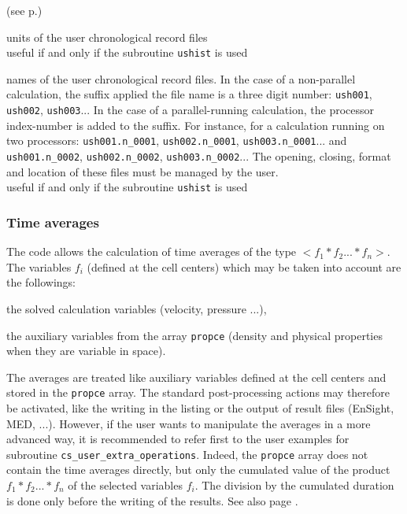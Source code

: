 (see p.\pageref{prg_ushist})

{units of the user chronological record files\\
useful if and only if the subroutine \texttt{ushist} is used}

{names of the user chronological record files.
In the case of a non-parallel calculation, the suffix applied the file
name is a three digit number: \texttt{ush001}, \texttt{ush002},
\texttt{ush003}...
In the case of a parallel-running calculation, the processor
index-number is added to the suffix. For instance, for a calculation
running on two processors:  \texttt{ush001.n\_0001},
\texttt{ush002.n\_0001}, \texttt{ush003.n\_0001}... and
\texttt{ush001.n\_0002},
\texttt{ush002.n\_0002}, \texttt{ush003.n\_0002}...
The opening, closing, format and location of these files must be managed
by the user.\\
useful if and only if the subroutine \texttt{ushist} is used}


\subsubsection{Time averages}

The code allows the calculation of time averages of the type
$<f_1*f_2...*f_n>$. The variables $f_i$ (defined at the cell centers)
which may be taken into account are the followings:
\begin{list}{-}{}
\item the solved calculation variables (velocity, pressure ...),
\item the auxiliary variables from the array {\tt propce} (density and
      physical properties when they are variable in space).
\end{list}

The averages are treated like auxiliary variables defined at the cell
centers and stored in the {\tt propce} array. The standard post-processing
actions may therefore be activated, like the writing in the listing or
the output of result files (EnSight, MED, ...). However, if the user
wants to manipulate the averages in a more advanced way, it is
recommended to refer first to the user examples for subroutine
\texttt{cs\_user\_extra\_operations}. Indeed, the {\tt propce} array
does not contain the time averages directly, but only the cumulated value
of the product $f_1*f_2...*f_n$ of the selected
variables $f_i$. The division by the cumulated duration is done only
before the writing of the results. See also page \pageref{prg_moyennes}.

